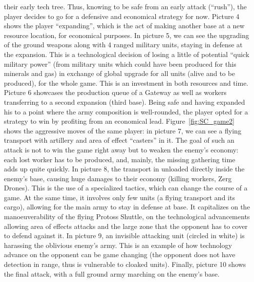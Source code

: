 their early tech tree. Thus, knowing to be safe from an early attack (``rush''), the player decides to go for a defensive and economical strategy for now. Picture 4 shows the player ``expanding'', which is the act of making another base at a new resource location, for economical purposes. In picture 5, we can see the upgrading of the ground weapons along with 4 ranged military units, staying in defense at the expansion. This is a technological decision of losing a little of potential ``quick military power'' (from military units which could have been produced for this minerals and gas) in exchange of global upgrade for all units (alive and to be produced), for the whole game. This is an investment in both resources and time. Picture 6 showcases the production queue of a Gateway as well as workers transferring to a second expansion (third base). Being safe and having expanded his  to a point where the army composition is well-rounded, the player opted for a strategy to win by profiting from an economical lead. Figure~\ref{fig:SC_game2} shows the aggressive moves of the same player: in picture 7, we can see a flying transport with artillery and area of effect ``casters'' in it. The goal of such an attack is not to win the game right away but to weaken the enemy's economy: each lost worker has to be produced, and, mainly, the missing gathering time adds up quite quickly. In picture 8, the transport in unloaded directly inside the enemy's base, causing huge damages to their economy (killing workers, Zerg Drones). This is the use of a specialized tactics, which can change the course of a game. At the same time, it involves only few units (a flying transport and its cargo), allowing for the main army to stay in defense at base. It capitalizes on the manoeuverability of the flying Protoss Shuttle, on the technological advancements allowing area of effects attacks and the large zone that the opponent has to cover to defend against it. In picture 9, an invisible attacking unit (circled in white) is harassing the oblivious enemy's army. This is an example of how technology advance on the opponent can be game changing (the opponent does not have detection in range, thus is vulnerable to cloaked units). Finally, picture 10 shows the final attack, with a full ground army marching on the enemy's base.


